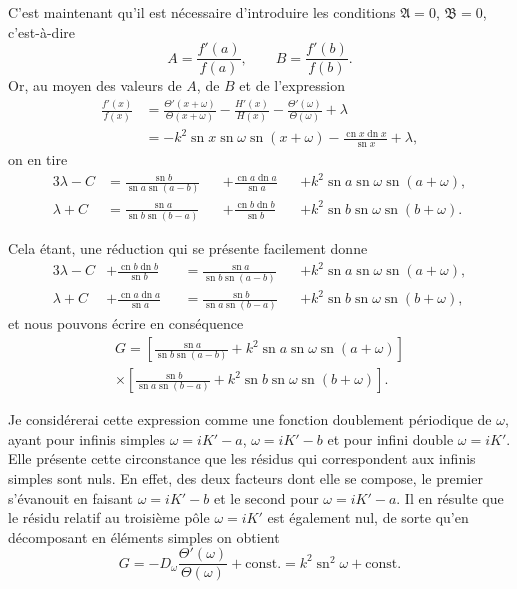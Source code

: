 \documentclass[11pt,leqno,oneside,letterpaper]{book}[2005/09/16]
\DeclareMathOperator{\sn}{sn}
\DeclareMathOperator{\cn}{cn}
\DeclareMathOperator{\dn}{dn}
\begin{document}
C'est maintenant qu'il est n\'ecessaire d'introduire les conditions $\mathfrak{A} = 0$,
$\mathfrak{B} = 0$, c'est-\`a-dire
\[
A = \frac{f'(a)}{f(a)},\qquad
B = \frac{f'(b)}{f(b)}.
\]
Or, au moyen des valeurs de $A$,
de $B$ et de l'expression
\begin{align*}
\frac{f'(x)}{f(x)}
&= \frac{\Theta'(x + \omega)}{\Theta(x+\omega)}
  -\frac{H'(x)}{H(x)} - \frac{\Theta'(\omega)}{\Theta(\omega)} + \lambda \\
&= - k^2 \sn x \sn \omega \sn ( x + \omega ) - \frac{\cn x \dn x}{\sn x} + \lambda,
\end{align*}
on en tire
\begin{alignat*}{3}
\lambda - C &= \frac{\sn b}{\sn a \sn (a-b)} &&+ \frac{\cn a \dn a}{\sn a}
  &&+ k^2 \sn a \sn \omega \sn ( a + \omega ), \\
\lambda + C &= \frac{\sn a}{\sn b \sn (b-a)} &&+ \frac{\cn b \dn b}{\sn b}
  &&+ k^2 \sn b \sn \omega \sn ( b + \omega ).
\end{alignat*}

Cela \'etant, une r\'eduction qui se pr\'esente facilement donne
\begin{alignat*}{3}
\lambda - C &+ \frac{ \cn b \dn b }{\sn b} &&= \frac{\sn a}{\sn b \sn (a-b)}
&&  + k^2 \sn a \sn \omega \sn (a + \omega), \\
\lambda + C &+ \frac{ \cn a \dn a }{\sn a} &&= \frac{\sn b}{\sn a \sn (b-a)}
&&  + k^2 \sn b \sn \omega \sn (b + \omega),
\end{alignat*}
et nous pouvons \'ecrire en cons\'equence
\begin{multline*}
G =  \left[ \frac{ \sn a }{ \sn b \sn (a-b) } + k^2 \sn a \sn \omega \sn (a+\omega) \right]\\
             \times \left[ \frac{ \sn b }{ \sn a \sn (b-a) } + k^2 \sn b \sn \omega \sn (b+\omega) \right].
\end{multline*}

Je consid\'ererai cette expression comme une fonction doublement p\'eriodi\-que
de $\omega$, ayant pour infinis simples $\omega = iK' - a$, $\omega = iK' - b$ et pour
infini double $\omega = iK'$. Elle pr\'esente cette circonstance que les r\'esidus qui
correspondent aux infinis simples sont nuls. En effet, des deux facteurs
dont elle se compose, le premier s'\'evanouit en faisant $\omega = iK' - b$ et le
second pour $\omega = iK' - a$. Il en r\'esulte que le r\'esidu relatif au troisi\`eme
p\^ole $\omega = iK'$ est \'egalement nul, de sorte qu'en d\'ecomposant en \'el\'ements
simples on obtient
\[
G = -D_{\omega} \frac{\Theta'(\omega)}{\Theta(\omega)} + \textrm{const.}
  = k^2 \sn^2 \omega + \textrm{const.}
\]
\end{document}

